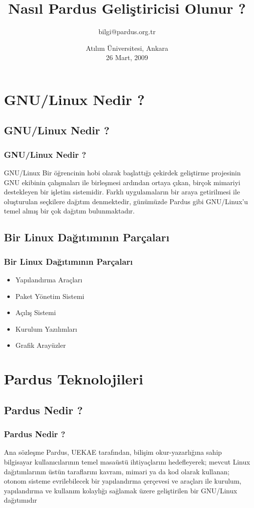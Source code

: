 \documentclass{beamer}
\title{Nasıl Pardus Geliştiricisi Olunur ?}
\author[Gökmen Göksel \& Gökçen Eraslan]{bilgi@pardus.org.tr}
\date{Atılım Üniversitesi, Ankara\\ 26 Mart, 2009}
\institute{
  Ulusal Elektronik ve Kriptoloji Araştırma Enstitüsü\\
  TÜBİTAK}
\begin{document}
\frame{\titlepage}

\section{GNU/Linux Nedir ?}

\subsection{GNU/Linux Nedir ?}
\frame
{
    \frametitle{GNU/Linux Nedir ?}
    \begin{block}{GNU/Linux}
        Bir öğrencinin hobi olarak başlattığı çekirdek geliştirme projesinin GNU ekibinin çalışmaları ile birleşmesi ardından ortaya çıkan, birçok mimariyi destekleyen bir işletim sistemidir. Farklı uygulamaların bir araya getirilmesi ile oluşturulan seçkilere dağıtım denmektedir, günümüzde Pardus gibi GNU/Linux'u temel almış bir çok dağıtım bulunmaktadır.
    \end{block}
}

\subsection{Bir Linux Dağıtımının Parçaları}
\frame
{
    \frametitle{Bir Linux Dağıtımının Parçaları}
    \begin{itemize}
       \item Yapılandırma Araçları
       \item Paket Yönetim Sistemi
       \item Açılış Sistemi
       \item Kurulum Yazılımları
       \item Grafik Arayüzler
    \end{itemize}
}

\section{Pardus Teknolojileri}

\subsection{Pardus Nedir ?}
\frame
{
    \frametitle{Pardus Nedir ?}
    \begin{block}{Ana sözleşme}
        Pardus, UEKAE tarafından, bilişim okur-yazarlığına sahip bilgisayar kullanıcılarının temel masaüstü ihtiyaçlarını hedefleyerek; mevcut Linux dağıtımlarının üstün taraflarını kavram, mimari ya da kod olarak kullanan; otonom sisteme evrilebilecek bir yapılandırma çerçevesi ve araçları ile kurulum, yapılandırma ve kullanım kolaylığı sağlamak üzere geliştirilen bir GNU/Linux dağıtımıdır
    \end{block}
}
\end{document}
